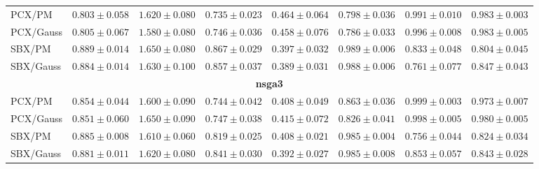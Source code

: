 \begin{table}[!htbp]
\begin{tabular}{lccccccc}
\cmidrule(lr){1-8}
PCX/PM & $0.803 \pm 0.058$ & $1.620 \pm 0.080$ & $0.735 \pm 0.023$ & $0.464 \pm 0.064$ & $0.798 \pm 0.036$ & $0.991 \pm 0.010$ & $0.983 \pm 0.003$ \\
PCX/Gauss & $0.805 \pm 0.067$ & $\mathbf{1.580 \pm 0.080}$ & $0.746 \pm 0.036$ & $0.458 \pm 0.076$ & $0.786 \pm 0.033$ & $\mathbf{0.996 \pm 0.008}$ & $\mathbf{0.983 \pm 0.005}$ \\
SBX/PM & $\mathbf{0.889 \pm 0.014}$ & $1.650 \pm 0.080$ & $\mathbf{0.867 \pm 0.029}$ & $0.397 \pm 0.032$ & $\mathbf{0.989 \pm 0.006}$ & $0.833 \pm 0.048$ & $0.804 \pm 0.045$ \\
SBX/Gauss & $0.884 \pm 0.014$ & $1.630 \pm 0.100$ & $0.857 \pm 0.037$ & $0.389 \pm 0.031$ & $0.988 \pm 0.006$ & $0.761 \pm 0.077$ & $0.847 \pm 0.043$ \\
\midrule
\multicolumn{8}{c}{\textbf{\acrshort{nsga3}}} \\
\cmidrule(lr){1-8}
PCX/PM & $0.854 \pm 0.044$ & $\mathbf{1.600 \pm 0.090}$ & $0.744 \pm 0.042$ & $0.408 \pm 0.049$ & $0.863 \pm 0.036$ & $\mathbf{0.999 \pm 0.003}$ & $0.973 \pm 0.007$ \\
PCX/Gauss & $0.851 \pm 0.060$ & $1.650 \pm 0.090$ & $0.747 \pm 0.038$ & $0.415 \pm 0.072$ & $0.826 \pm 0.041$ & $0.998 \pm 0.005$ & $\mathbf{0.980 \pm 0.005}$ \\
SBX/PM & $\mathbf{0.885 \pm 0.008}$ & $1.610 \pm 0.060$ & $0.819 \pm 0.025$ & $0.408 \pm 0.021$ & $\mathbf{0.985 \pm 0.004}$ & $0.756 \pm 0.044$ & $0.824 \pm 0.034$ \\
SBX/Gauss & $0.881 \pm 0.011$ & $1.620 \pm 0.080$ & $\mathbf{0.841 \pm 0.030}$ & $0.392 \pm 0.027$ & $0.985 \pm 0.008$ & $0.853 \pm 0.057$ & $0.843 \pm 0.028$ \\
\bottomrule
\end{tabular}
\end{table}

